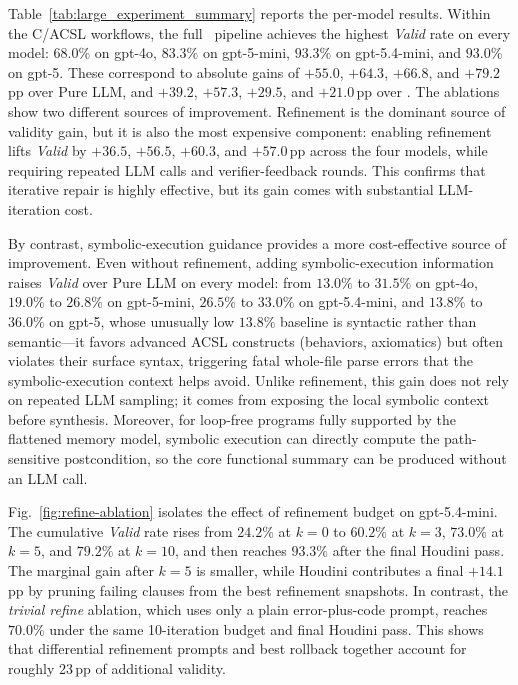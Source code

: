 \label{subsec:rq5-valid}



\DIFaddbegin
Table~\ref{tab:large_experiment_summary} reports the per-model results. Within the C/ACSL workflows, the full \toolname\ pipeline achieves the highest \emph{Valid} rate on every model: \(68.0\%\) on gpt-4o, \(83.3\%\) on gpt-5-mini, \(93.3\%\) on gpt-5.4-mini, and \(93.0\%\) on gpt-5. These correspond to absolute gains of \(+55.0\), \(+64.3\), \(+66.8\), and \(+79.2\)\,pp over Pure LLM, and \(+39.2\), \(+57.3\), \(+29.5\), and \(+21.0\)\,pp over \autospec.
The ablations show two different sources of improvement. Refinement is the dominant source of validity gain, but it is also the most expensive component: enabling refinement lifts \emph{Valid} by \(+36.5\), \(+56.5\), \(+60.3\), and \(+57.0\)\,pp across the four models, while requiring repeated LLM calls and verifier-feedback rounds. This confirms that iterative repair is highly effective, but its gain comes with substantial LLM-iteration cost.
\DIFaddend

\DIFaddbegin
By contrast, symbolic-execution guidance provides a more cost-effective source of improvement. Even without refinement, adding symbolic-execution information raises \emph{Valid} over Pure LLM on every model: from \(13.0\%\) to \(31.5\%\) on gpt-4o, \(19.0\%\) to \(26.8\%\) on gpt-5-mini, \(26.5\%\) to \(33.0\%\) on gpt-5.4-mini, and \(13.8\%\) to \(36.0\%\) on gpt-5, whose unusually low \(13.8\%\) baseline is syntactic rather than semantic---it favors advanced ACSL constructs (behaviors, axiomatics) but often violates their surface syntax, triggering fatal whole-file parse errors that the symbolic-execution context helps avoid. Unlike refinement, this gain does not rely on repeated LLM sampling; it comes from exposing the local symbolic context before synthesis. Moreover, for loop-free programs fully supported by the flattened memory model, symbolic execution can directly compute the path-sensitive postcondition, so the core functional summary can be produced without an LLM call.
\DIFaddend

\DIFaddbegin
Fig.~\ref{fig:refine-ablation} isolates the effect of refinement budget on gpt-5.4-mini. The cumulative \emph{Valid} rate rises from \(24.2\%\) at \(k{=}0\) to \(60.2\%\) at \(k{=}3\), \(73.0\%\) at \(k{=}5\), and \(79.2\%\) at \(k{=}10\), and then reaches \(93.3\%\) after the final Houdini pass. The marginal gain after \(k{=}5\) is smaller, while Houdini contributes a final \(+14.1\)\,pp by pruning failing clauses from the best refinement snapshots. In contrast, the \emph{trivial refine} ablation, which uses only a plain error-plus-code prompt, reaches \(70.0\%\) under the same 10-iteration budget and final Houdini pass. This shows that differential refinement prompts and best rollback together account for roughly 23\,pp of additional validity.
\DIFaddend

